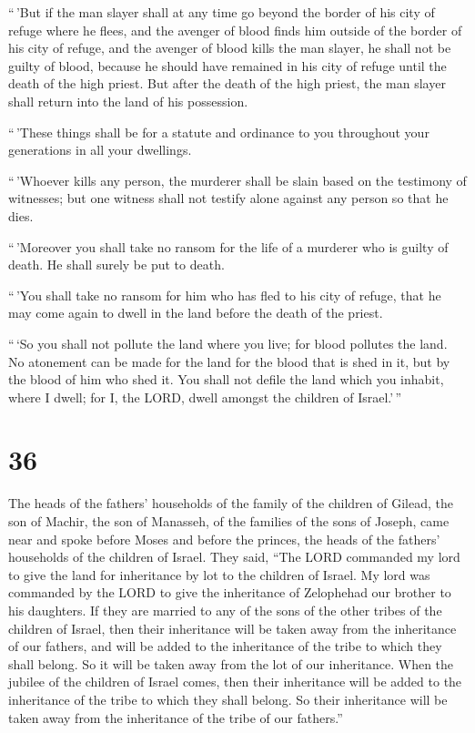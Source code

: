  ``\,'But if the man slayer shall at any time go beyond the
border of his city of refuge where he flees,  and the
avenger of blood finds him outside of the border of his city of refuge,
and the avenger of blood kills the man slayer, he shall not be guilty of
blood,  because he should have remained in his city of
refuge until the death of the high priest. But after the death of the
high priest, the man slayer shall return into the land of his
possession.

 ``\,'These things shall be for a statute and ordinance to
you throughout your generations in all your dwellings.

 ``\,'Whoever kills any person, the murderer shall be slain
based on the testimony of witnesses; but one witness shall not testify
alone against any person so that he dies.

 ``\,'Moreover you shall take no ransom for the life of a
murderer who is guilty of death. He shall surely be put to death.

 ``\,'You shall take no ransom for him who has fled to his
city of refuge, that he may come again to dwell in the land before the
death of the priest.

 ``\,`So you shall not pollute the land where you live; for
blood pollutes the land. No atonement can be made for the land for the
blood that is shed in it, but by the blood of him who shed it.
 You shall not defile the land which you inhabit, where I
dwell; for I, the LORD, dwell amongst the children of Israel.'\,''

\hypertarget{section-35}{%
\section{36}\label{section-35}}

 The heads of the fathers' households of the family of the
children of Gilead, the son of Machir, the son of Manasseh, of the
families of the sons of Joseph, came near and spoke before Moses and
before the princes, the heads of the fathers' households of the children
of Israel.  They said, ``The LORD commanded my lord to give
the land for inheritance by lot to the children of Israel. My lord was
commanded by the LORD to give the inheritance of Zelophehad our brother
to his daughters.  If they are married to any of the sons of
the other tribes of the children of Israel, then their inheritance will
be taken away from the inheritance of our fathers, and will be added to
the inheritance of the tribe to which they shall belong. So it will be
taken away from the lot of our inheritance.  When the
jubilee of the children of Israel comes, then their inheritance will be
added to the inheritance of the tribe to which they shall belong. So
their inheritance will be taken away from the inheritance of the tribe
of our fathers.''

